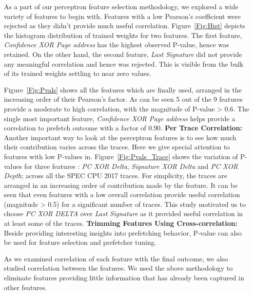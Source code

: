 As a part of our perceptron feature selection methodology, we explored
a wide variety of features to begin with. Features with a low
Pearson's coefficient were rejected as they didn't provide much useful
correlation.  Figure~\ref{Fig:Hist} depicts the histogram distribution
of trained weights for two features.  The first feature,
\textit{Confidence XOR Page address} has the highest observed P-value,
hence was retained.  On the other hand, the second feature,
\textit{Last Signature} did not provide any meaningful correlation and
hence was rejected.  This is visible from the bulk of its trained
weights settling to near zero values.

Figure~\ref{Fig:Pvals} shows all the features which are finally used,
arranged in the increasing order of their Pearson's factor.  As can be
seen 5 out of the 9 features provide a moderate to high correlation,
with the magnitude of P-value > 0.6. The single most important
feature, \textit{Confidence XOR Page address} helps provide
a correlation to prefetch outcome with a factor of 0.90. 
\newline
\newline
\noindent \textbf{Per Trace Correlation:} Another important way to look
at the perceptron features is to see how much their contribution
varies across the traces. Here we give special attention to features
with low P-values in. Figure~\ref{Fig:Pvals_Trace} shows the variation
of P-values for three features : \textit{PC XOR Delta},
\textit{Signature XOR Delta} and \textit{PC XOR Depth}; across all the
SPEC CPU 2017 traces.  For simplicity, the traces are arranged in an
increasing order of contribution made by the feature.  It can be seen
that even features with a low overall correlation provide useful
correlation (magnitude > 0.5) for a significant number of traces. This
study motivated us to choose \textit{PC XOR DELTA} over \textit{Last
  Signature} as it provided useful correlation in at least some of the
traces.
\newline
\newline
\noindent \textbf{Trimming Features Using Cross-correlation:} Beside
providing interesting insights into prefetching behavior, P-value can
also be used for feature selection and prefetcher tuning.

As we examined correlation of each feature with the final outcome, we
also studied correlation between the features.  We used the above
methodology to eliminate features providing little information that
has already been captured in other features.

